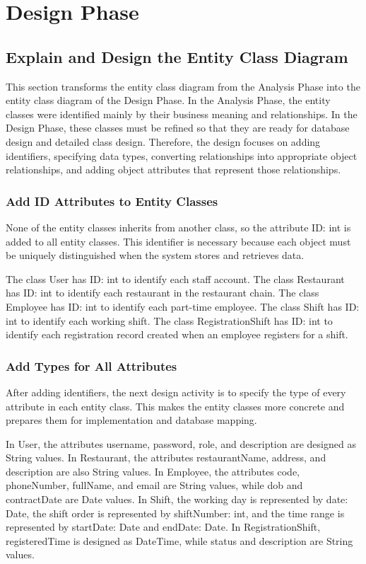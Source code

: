 \chapter{Design Phase}

\section{Explain and Design the Entity Class Diagram}

This section transforms the entity class diagram from the Analysis Phase into the entity class diagram of the Design Phase. In the Analysis Phase, the entity classes were identified mainly by their business meaning and relationships. In the Design Phase, these classes must be refined so that they are ready for database design and detailed class design. Therefore, the design focuses on adding identifiers, specifying data types, converting relationships into appropriate object relationships, and adding object attributes that represent those relationships.

\subsection{Add ID Attributes to Entity Classes}

None of the entity classes inherits from another class, so the attribute ID: int is added to all entity classes. This identifier is necessary because each object must be uniquely distinguished when the system stores and retrieves data.

The class User has ID: int to identify each staff account. The class Restaurant has ID: int to identify each restaurant in the restaurant chain. The class Employee has ID: int to identify each part-time employee. The class Shift has ID: int to identify each working shift. The class RegistrationShift has ID: int to identify each registration record created when an employee registers for a shift.

\subsection{Add Types for All Attributes}

After adding identifiers, the next design activity is to specify the type of every attribute in each entity class. This makes the entity classes more concrete and prepares them for implementation and database mapping.

In User, the attributes username, password, role, and description are designed as String values. In Restaurant, the attributes restaurantName, address, and description are also String values. In Employee, the attributes code, phoneNumber, fullName, and email are String values, while dob and contractDate are Date values. In Shift, the working day is represented by date: Date, the shift order is represented by shiftNumber: int, and the time range is represented by startDate: Date and endDate: Date. In RegistrationShift, registeredTime is designed as DateTime, while status and description are String values.

